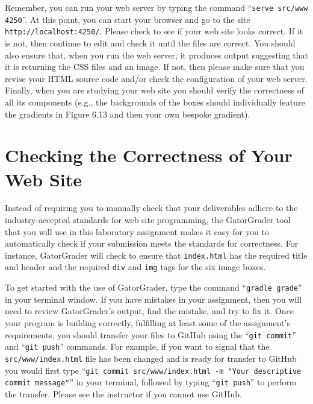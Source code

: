\documentclass[11pt]{article}
\newcommand{\mainprogram}{\lstinline{index.html}}
\newcommand{\mainprogramsource}{\lstinline{src/www/index.html}}
\newcommand{\gatorgraderstart}{\command{gradle grade}}
\newcommand{\gitcommit}{\command{git commit}}
\newcommand{\gitpush}{\command{git push}}
\newcommand{\gitcommitmainprogram}{\command{git commit src/www/index.html -m "Your
descriptive commit message"}}
\newcommand{\command}[1]{``\lstinline{#1}''}
\newcommand{\program}[1]{\lstinline{#1}}
\newcommand{\url}[1]{\lstinline{#1}}
\begin{document}
Remember, you can run your web server by typing the command \command{serve
src/www 4250}. At this point, you can start your browser and go to the site
\url{http://localhost:4250/}. Please check to see if your web site looks
correct. If it is not, then continue to edit and check it until the files are
correct. You should also ensure that, when you run the web server, it produces
output suggesting that it is returning the CSS files and an image. If not, then
please make sure that you revise your HTML source code and/or check the
configuration of your web server. Finally, when you are studying your web site
you should verify the correctness of all its components (e.g., the backgrounds
of the boxes should individually feature the gradients in Figure 6.13 and then
your own bespoke gradient).

\section*{Checking the Correctness of Your Web Site}

Instead of requiring you to manually check that your deliverables adhere to the
industry-accepted standards for web site programming, the GatorGrader tool that
you will use in this laboratory assignment makes it easy for you to
automatically check if your submission meets the standards for correctness. For
instance, GatorGrader will check to ensure that \mainprogram{} has the required
title and header and the required \program{div} and \program{img} tags for the
six image boxes.

To get started with the use of GatorGrader, type the command \gatorgraderstart{}
in your terminal window. If you have mistakes in your assignment, then you will
need to review GatorGrader's output, find the mistake, and try to fix it. Once
your program is building correctly, fulfilling at least some of the assignment's
requirements, you should transfer your files to GitHub using the \gitcommit{}
and \gitpush{} commands. For example, if you want to signal that the
\mainprogramsource{} file has been changed and is ready for transfer to GitHub
you would first type \gitcommitmainprogram{} in your terminal, followed by
typing \gitpush{} to perform the transfer. Please see the instructor if you
cannot use GitHub.
\end{document}
